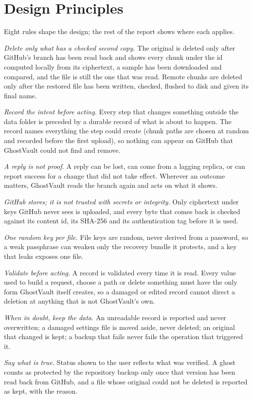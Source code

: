 \section{Design Principles}\label{sec:principles}

Eight rules shape the design; the rest of the report shows where each applies.

\emph{Delete only what has a checked second copy.} The original is deleted only after GitHub's
branch has been read back and shows every chunk under the id computed locally from its
ciphertext, a sample has been downloaded and compared, and the file is still the one that was
read. Remote chunks are deleted only after the restored file has been written, checked, flushed
to disk and given its final name.

\emph{Record the intent before acting.} Every step that changes something outside the data folder
is preceded by a durable record of what is about to happen. The record names everything the step
could create (chunk paths are chosen at random and recorded before the first upload), so nothing
can appear on GitHub that GhostVault could not find and remove.

\emph{A reply is not proof.} A reply can be lost, can come from a lagging replica, or can report
success for a change that did not take effect. Wherever an outcome matters, GhostVault reads the
branch again and acts on what it shows.

\emph{GitHub stores; it is not trusted with secrets or integrity.} Only ciphertext under keys
GitHub never sees is uploaded, and every byte that comes back is checked against its content id,
its SHA-256 and its authentication tag before it is used.

\emph{One random key per file.} File keys are random, never derived from a password, so a weak
passphrase can weaken only the recovery bundle it protects, and a key that leaks exposes one file.

\emph{Validate before acting.} A record is validated every time it is read. Every value used to
build a request, choose a path or delete something must have the only form GhostVault itself
creates, so a damaged or edited record cannot direct a deletion at anything that is not
GhostVault's own.

\emph{When in doubt, keep the data.} An unreadable record is reported and never overwritten; a
damaged settings file is moved aside, never deleted; an original that changed is kept; a backup
that fails never fails the operation that triggered it.

\emph{Say what is true.} Status shown to the user reflects what was verified. A ghost counts as
protected by the repository backup only once that version has been read back from GitHub, and a
file whose original could not be deleted is reported as kept, with the reason.
